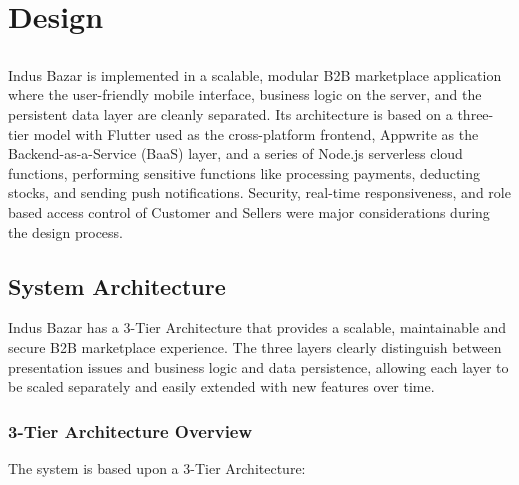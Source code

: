 \chapter{Design} \label{chap:design}


\section*{}
Indus Bazar is implemented in a scalable, modular B2B marketplace application where the user-friendly mobile interface, business logic on the server, and the persistent data layer are cleanly separated. Its architecture is based on a three-tier model with Flutter used as the cross-platform frontend, Appwrite as the Backend-as-a-Service (BaaS) layer, and a series of Node.js serverless cloud functions, performing sensitive functions like processing payments, deducting stocks, and sending push notifications. Security, real-time responsiveness, and role based access control of Customer and Sellers were major considerations during the design process.


\section{System Architecture}
Indus Bazar has a 3-Tier Architecture that provides a scalable, maintainable and secure B2B marketplace experience. The three layers clearly distinguish between presentation issues and business logic and data persistence, allowing each layer to be scaled separately and easily extended with new features over time.

\subsection{3-Tier Architecture Overview}

The system is based upon a 3-Tier Architecture:

